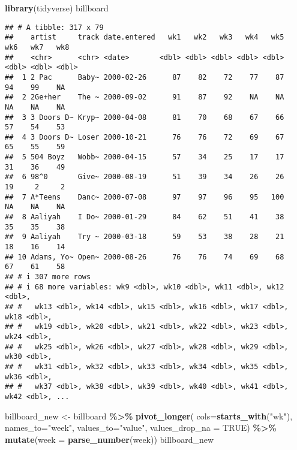 \documentclass[
]{article}
\newenvironment{Shaded}{\begin{snugshade}}{\end{snugshade}}
\newcommand{\AttributeTok}[1]{\textcolor[rgb]{0.13,0.29,0.53}{#1}}
\newcommand{\ConstantTok}[1]{\textcolor[rgb]{0.56,0.35,0.01}{#1}}
\newcommand{\FunctionTok}[1]{\textcolor[rgb]{0.13,0.29,0.53}{\textbf{#1}}}
\newcommand{\NormalTok}[1]{#1}
\newcommand{\OtherTok}[1]{\textcolor[rgb]{0.56,0.35,0.01}{#1}}
\newcommand{\SpecialCharTok}[1]{\textcolor[rgb]{0.81,0.36,0.00}{\textbf{#1}}}
\newcommand{\StringTok}[1]{\textcolor[rgb]{0.31,0.60,0.02}{#1}}
\begin{document}
\begin{Shaded}
\begin{Highlighting}[]
\FunctionTok{library}\NormalTok{(tidyverse)}
\NormalTok{billboard}
\end{Highlighting}
\end{Shaded}

\begin{verbatim}
## # A tibble: 317 x 79
##    artist     track date.entered   wk1   wk2   wk3   wk4   wk5   wk6   wk7   wk8
##    <chr>      <chr> <date>       <dbl> <dbl> <dbl> <dbl> <dbl> <dbl> <dbl> <dbl>
##  1 2 Pac      Baby~ 2000-02-26      87    82    72    77    87    94    99    NA
##  2 2Ge+her    The ~ 2000-09-02      91    87    92    NA    NA    NA    NA    NA
##  3 3 Doors D~ Kryp~ 2000-04-08      81    70    68    67    66    57    54    53
##  4 3 Doors D~ Loser 2000-10-21      76    76    72    69    67    65    55    59
##  5 504 Boyz   Wobb~ 2000-04-15      57    34    25    17    17    31    36    49
##  6 98^0       Give~ 2000-08-19      51    39    34    26    26    19     2     2
##  7 A*Teens    Danc~ 2000-07-08      97    97    96    95   100    NA    NA    NA
##  8 Aaliyah    I Do~ 2000-01-29      84    62    51    41    38    35    35    38
##  9 Aaliyah    Try ~ 2000-03-18      59    53    38    28    21    18    16    14
## 10 Adams, Yo~ Open~ 2000-08-26      76    76    74    69    68    67    61    58
## # i 307 more rows
## # i 68 more variables: wk9 <dbl>, wk10 <dbl>, wk11 <dbl>, wk12 <dbl>,
## #   wk13 <dbl>, wk14 <dbl>, wk15 <dbl>, wk16 <dbl>, wk17 <dbl>, wk18 <dbl>,
## #   wk19 <dbl>, wk20 <dbl>, wk21 <dbl>, wk22 <dbl>, wk23 <dbl>, wk24 <dbl>,
## #   wk25 <dbl>, wk26 <dbl>, wk27 <dbl>, wk28 <dbl>, wk29 <dbl>, wk30 <dbl>,
## #   wk31 <dbl>, wk32 <dbl>, wk33 <dbl>, wk34 <dbl>, wk35 <dbl>, wk36 <dbl>,
## #   wk37 <dbl>, wk38 <dbl>, wk39 <dbl>, wk40 <dbl>, wk41 <dbl>, wk42 <dbl>, ...
\end{verbatim}

\begin{Shaded}
\begin{Highlighting}[]
\NormalTok{billboard\_new }\OtherTok{\textless{}{-}}\NormalTok{ billboard }\SpecialCharTok{\%\textgreater{}\%} 
  \FunctionTok{pivot\_longer}\NormalTok{(}
    \AttributeTok{cols=}\FunctionTok{starts\_with}\NormalTok{(}\StringTok{"wk"}\NormalTok{),}
    \AttributeTok{names\_to=}\StringTok{"week"}\NormalTok{,}
    \AttributeTok{values\_to=}\StringTok{"value"}\NormalTok{,}
    \AttributeTok{values\_drop\_na =} \ConstantTok{TRUE}\NormalTok{) }\SpecialCharTok{\%\textgreater{}\%} \FunctionTok{mutate}\NormalTok{(}\AttributeTok{week =} \FunctionTok{parse\_number}\NormalTok{(week))}
\NormalTok{billboard\_new}
\end{Highlighting}
\end{Shaded}
\end{document}
